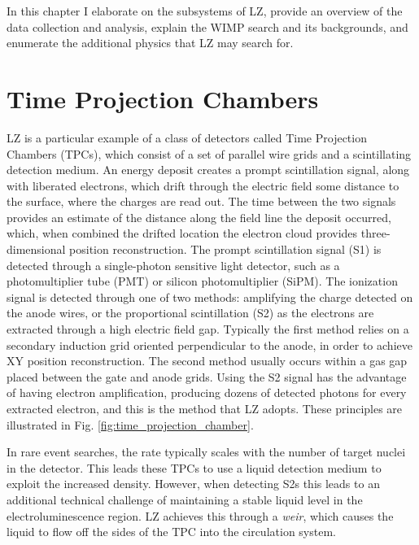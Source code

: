 In this chapter I elaborate on the subsystems of LZ, provide an overview of the data collection and analysis, explain the WIMP search and its backgrounds, and enumerate the additional physics that LZ may search for.


\section{Time Projection Chambers}
LZ is a particular example of a class of detectors called Time Projection Chambers (TPCs), which consist of a set of parallel wire grids and a scintillating detection medium.
An energy deposit creates a prompt scintillation signal, along with liberated electrons, which drift through the electric field some distance to the surface, where the charges are read out.
The time between the two signals provides an estimate of the distance along the field line the deposit occurred, which, when combined the drifted location the electron cloud provides three-dimensional position reconstruction.
The prompt scintillation signal (S1) is detected through a single-photon sensitive light detector, such as a photomultiplier tube (PMT) or silicon photomultiplier (SiPM).
The ionization signal is detected through one of two methods: amplifying the charge detected on the anode wires, or the proportional scintillation (S2) as the electrons are extracted through a high electric field gap.
Typically the first method relies on a secondary induction grid oriented perpendicular to the anode, in order to achieve XY position reconstruction.
The second method usually occurs within a gas gap placed between the gate and anode grids.
Using the S2 signal has the advantage of having electron amplification, producing dozens of detected photons for every extracted electron, and this is the method that LZ adopts.
These principles are illustrated in Fig. \ref{fig:time_projection_chamber}.

In rare event searches, the rate typically scales with the number of target nuclei in the detector.
This leads these TPCs to use a liquid detection medium to exploit the increased density.
However, when detecting S2s this leads to an additional technical challenge of maintaining a stable liquid level in the electroluminescence region.
LZ achieves this through a \textit{weir}, which causes the liquid to flow off the sides of the TPC into the circulation system.

